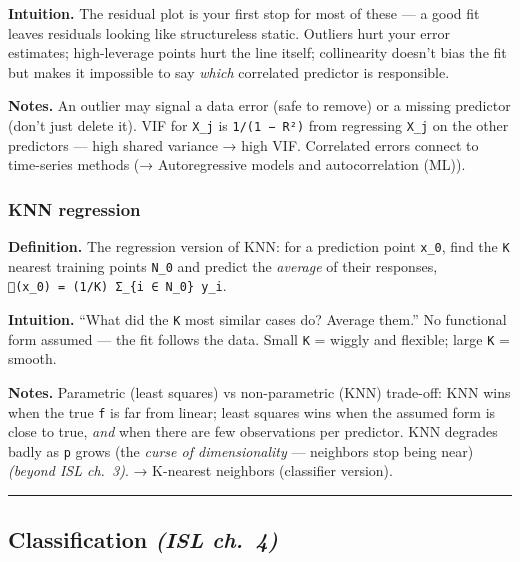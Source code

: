 \documentclass[
  10pt,
  letterpaper,
  onecolumn]{article}
\begin{document}
\textbf{Intuition.} The residual plot is your first stop for most of
these --- a good fit leaves residuals looking like structureless static.
Outliers hurt your error estimates; high-leverage points hurt the line
itself; collinearity doesn't bias the fit but makes it impossible to say
\emph{which} correlated predictor is responsible.

\textbf{Notes.} An outlier may signal a data error (safe to remove) or a
missing predictor (don't just delete it). VIF for \texttt{X\_j} is
\texttt{1/(1\ −\ R²)} from regressing \texttt{X\_j} on the other
predictors --- high shared variance → high VIF. Correlated errors
connect to time-series methods (→ Autoregressive models and
autocorrelation (ML)).

\hypertarget{knn-regression}{%
\subsubsection{KNN regression}\label{knn-regression}}

\textbf{Definition.} The regression version of KNN: for a prediction
point \texttt{x\_0}, find the \texttt{K} nearest training points
\texttt{N\_0} and predict the \emph{average} of their responses,
\texttt{(x\_0)\ =\ (1/K)\ Σ\_\{i\ ∈\ N\_0\}\ y\_i}.

\textbf{Intuition.} ``What did the \texttt{K} most similar cases do?
Average them.'' No functional form assumed --- the fit follows the data.
Small \texttt{K} = wiggly and flexible; large \texttt{K} = smooth.

\textbf{Notes.} Parametric (least squares) vs non-parametric (KNN)
trade-off: KNN wins when the true \texttt{f} is far from linear; least
squares wins when the assumed form is close to true, \emph{and} when
there are few observations per predictor. KNN degrades badly as
\texttt{p} grows (the \emph{curse of dimensionality} --- neighbors stop
being near) \emph{(beyond ISL ch.~3)}. → K-nearest neighbors (classifier
version).

\begin{center}\rule{0.5\linewidth}{0.5pt}\end{center}

\hypertarget{classification-isl-ch.-4}{%
\subsection{\texorpdfstring{Classification \emph{(ISL
ch.~4)}}{Classification (ISL ch.~4)}}\label{classification-isl-ch.-4}}
\end{document}
